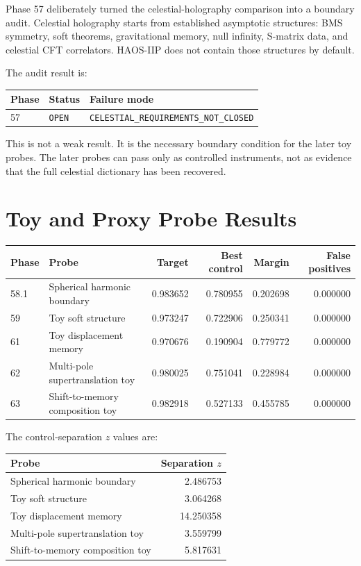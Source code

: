 \documentclass[11pt]{article}
\begin{document}
Phase 57 deliberately turned the celestial-holography comparison into a boundary audit. Celestial holography starts from established asymptotic structures: BMS symmetry, soft theorems, gravitational memory, null infinity, S-matrix data, and celestial CFT correlators. HAOS-IIP does not contain those structures by default.

The audit result is:
\begin{center}
\begin{tabular}{lll}
\toprule
Phase & Status & Failure mode \\
\midrule
57 & \texttt{OPEN} & \texttt{CELESTIAL\_REQUIREMENTS\_NOT\_CLOSED} \\
\bottomrule
\end{tabular}
\end{center}

This is not a weak result. It is the necessary boundary condition for the later toy probes. The later probes can pass only as controlled instruments, not as evidence that the full celestial dictionary has been recovered.

\section{Toy and Proxy Probe Results}

\begin{center}
\begin{tabular}{llrrrr}
\toprule
Phase & Probe & Target & Best control & Margin & False positives \\
\midrule
58.1 & Spherical harmonic boundary & 0.983652 & 0.780955 & 0.202698 & 0.000000 \\
59 & Toy soft structure & 0.973247 & 0.722906 & 0.250341 & 0.000000 \\
61 & Toy displacement memory & 0.970676 & 0.190904 & 0.779772 & 0.000000 \\
62 & Multi-pole supertranslation toy & 0.980025 & 0.751041 & 0.228984 & 0.000000 \\
63 & Shift-to-memory composition toy & 0.982918 & 0.527133 & 0.455785 & 0.000000 \\
\bottomrule
\end{tabular}
\end{center}

The control-separation $z$ values are:
\begin{center}
\begin{tabular}{lr}
\toprule
Probe & Separation $z$ \\
\midrule
Spherical harmonic boundary & 2.486753 \\
Toy soft structure & 3.064268 \\
Toy displacement memory & 14.250358 \\
Multi-pole supertranslation toy & 3.559799 \\
Shift-to-memory composition toy & 5.817631 \\
\bottomrule
\end{tabular}
\end{center}
\end{document}
